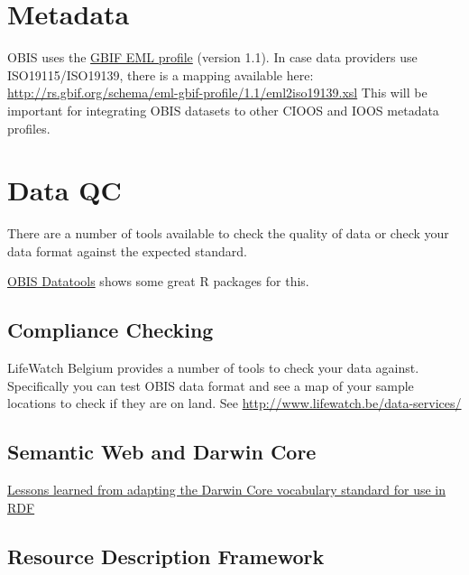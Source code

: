 \documentclass[
]{book}
\begin{document}
\hypertarget{metadata}{%
\section{Metadata}\label{metadata}}

OBIS uses the \href{http://rs.gbif.org/schema/eml-gbif-profile/1.1/eml-gbif-profile.xsd}{GBIF EML profile} (version 1.1). In case data providers use ISO19115/ISO19139, there is a mapping available here: \url{http://rs.gbif.org/schema/eml-gbif-profile/1.1/eml2iso19139.xsl} This will be important for integrating OBIS datasets to other CIOOS and IOOS metadata profiles.

\hypertarget{data-qc}{%
\section{Data QC}\label{data-qc}}

There are a number of tools available to check the quality of data or check your data format against the expected standard.

\href{https://obis.org/manual/processing/}{OBIS Datatools} shows some great R packages for this.

\hypertarget{compliance-checking}{%
\subsection{Compliance Checking}\label{compliance-checking}}

LifeWatch Belgium provides a number of tools to check your data against.
Specifically you can test OBIS data format and see a map of your sample locations to check if they are on land.
See \url{http://www.lifewatch.be/data-services/}

\hypertarget{semantic-web-and-darwin-core}{%
\subsection{Semantic Web and Darwin Core}\label{semantic-web-and-darwin-core}}

\href{http://www.semantic-web-journal.net/system/files/swj1093.pdf}{Lessons learned from adapting the Darwin Core vocabulary standard for use in RDF}

\hypertarget{resource-description-framework}{%
\subsection{Resource Description Framework}\label{resource-description-framework}}
\end{document}
